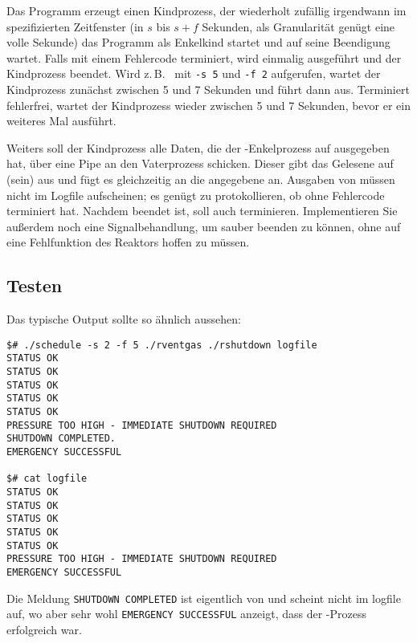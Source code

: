 Das Programm  erzeugt einen Kindprozess, der wiederholt zufällig
irgendwann im spezifizierten Zeitfenster (in $s$ bis $s+f$ Sekunden, als
Granularität genügt eine volle Sekunde) das Programm  als
Enkelkind startet und auf seine Beendigung wartet. Falls  mit
einem Fehlercode terminiert, wird einmalig  ausgeführt und der
Kindprozess beendet. Wird z.\,B.\  mit \verb_-s 5_ und
\verb_-f 2_ aufgerufen, wartet der Kindprozess zunächst zwischen 5 und 7
Sekunden und führt dann  aus. Terminiert 
fehlerfrei, wartet der Kindprozess wieder zwischen 5 und 7 Sekunden, bevor er
 ein weiteres Mal ausführt.

Weiters soll der Kindprozess alle Daten, die der -Enkelprozess auf
 ausgegeben hat, über eine Pipe an den Vaterprozess schicken.
Dieser gibt das Gelesene auf (sein)  aus und fügt es gleichzeitig
an die angegebene  an. Ausgaben von  müssen nicht
im Logfile aufscheinen; es genügt zu protokollieren, ob  ohne
Fehlercode terminiert hat. Nachdem  beendet ist, soll auch
 terminieren. Implementieren Sie außerdem noch eine
Signalbehandlung, um  sauber beenden zu können, ohne auf eine
Fehlfunktion des Reaktors hoffen zu müssen.

\subsection*{Testen}

Das typische Output sollte so ähnlich aussehen:
\begin{verbatim}
$# ./schedule -s 2 -f 5 ./rventgas ./rshutdown logfile
STATUS OK
STATUS OK
STATUS OK
STATUS OK
STATUS OK
PRESSURE TOO HIGH - IMMEDIATE SHUTDOWN REQUIRED
SHUTDOWN COMPLETED.
EMERGENCY SUCCESSFUL

$# cat logfile
STATUS OK
STATUS OK
STATUS OK
STATUS OK
STATUS OK
PRESSURE TOO HIGH - IMMEDIATE SHUTDOWN REQUIRED
EMERGENCY SUCCESSFUL
\end{verbatim}
Die Meldung \verb_SHUTDOWN COMPLETED_ ist eigentlich von  und
scheint nicht im logfile auf, wo aber sehr wohl \verb_EMERGENCY SUCCESSFUL_
anzeigt, dass der -Prozess erfolgreich war.

\osueguidelinestwo


